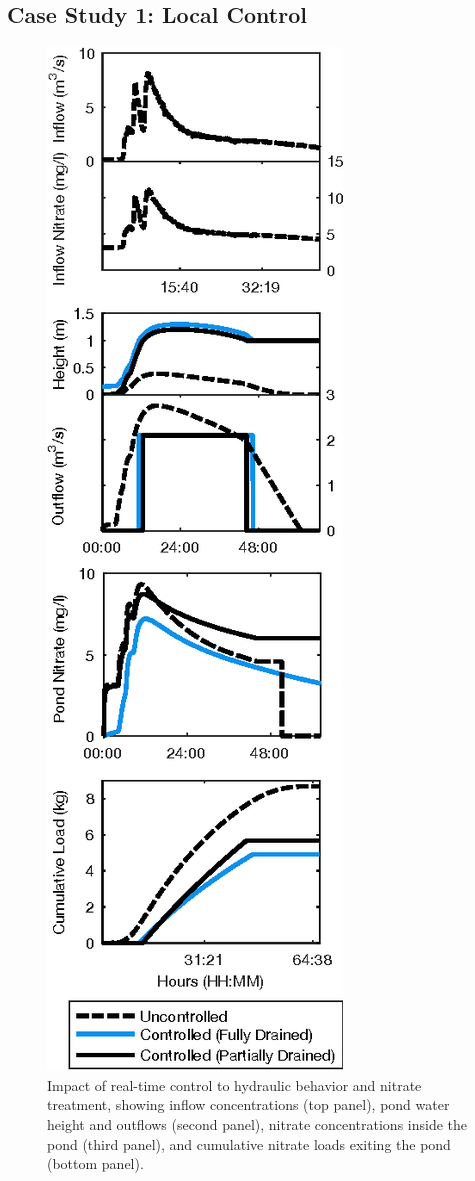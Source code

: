 
\subsection{Case Study 1: Local Control}

\begin{figure}
\centering
  \includegraphics{gfx/Chapter-1/local.eps}
  \caption{Impact of real-time control to hydraulic behavior and nitrate treatment, showing inflow concentrations (top panel), pond water height and outflows (second panel), nitrate concentrations inside the pond (third panel), and cumulative nitrate loads exiting the pond (bottom panel).}\label{fig-ch1:local_control}
\end{figure}

